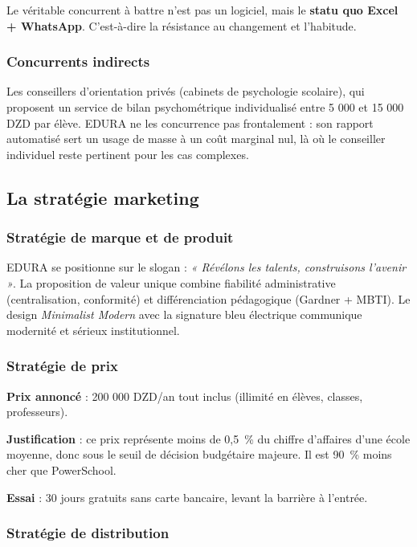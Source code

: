 \documentclass[12pt,a4paper,oneside]{report}
\begin{document}
Le véritable concurrent à battre n'est pas un logiciel, mais le \textbf{statu quo Excel + WhatsApp}. C'est-à-dire la résistance au changement et l'habitude.

\subsubsection{Concurrents indirects}

Les conseillers d'orientation privés (cabinets de psychologie scolaire), qui proposent un service de bilan psychométrique individualisé entre 5 000 et 15 000 DZD par élève. EDURA ne les concurrence pas frontalement : son rapport automatisé sert un usage de masse à un coût marginal nul, là où le conseiller individuel reste pertinent pour les cas complexes.

\subsection{La stratégie marketing}

\subsubsection{Stratégie de marque et de produit}

EDURA se positionne sur le slogan : \textit{« Révélons les talents, construisons l'avenir »}. La proposition de valeur unique combine fiabilité administrative (centralisation, conformité) et différenciation pédagogique (Gardner + MBTI). Le design \textit{Minimalist Modern} avec la signature bleu électrique communique modernité et sérieux institutionnel.

\subsubsection{Stratégie de prix}

\textbf{Prix annoncé} : 200 000 DZD/an tout inclus (illimité en élèves, classes, professeurs).

\textbf{Justification} : ce prix représente moins de 0,5~\% du chiffre d'affaires d'une école moyenne, donc sous le seuil de décision budgétaire majeure. Il est 90~\% moins cher que PowerSchool.

\textbf{Essai} : 30 jours gratuits sans carte bancaire, levant la barrière à l'entrée.

\subsubsection{Stratégie de distribution}
\end{document}
